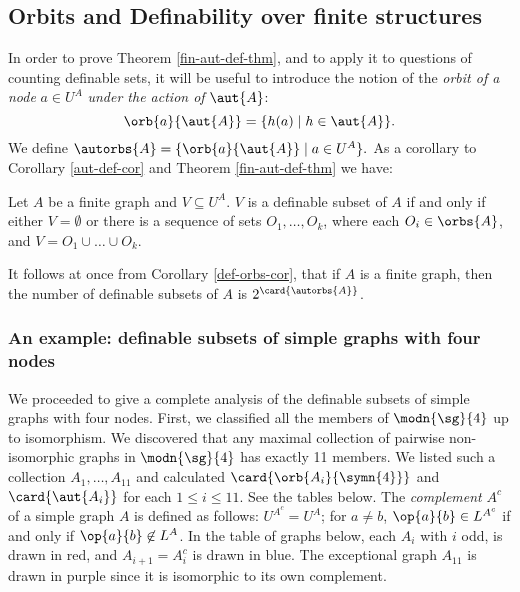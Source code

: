 \subsection{Orbits and Definability over finite structures}

In order to prove Theorem \ref{fin-aut-def-thm}, and to apply it to questions of counting definable sets, it will be useful to introduce the notion of the \emph{orbit of a node} $a\in U^A$ \emph{under the action of} $\aut{A}$:
\[
\orb{a}{\aut{A}}=\{h(a)\mid h\in\aut{A}\}.
\]
We define $\autorbs{A}=\{\orb{a}{\aut{A}}\mid a\in U^A\}.$ As a corollary to Corollary \ref{aut-def-cor} and Theorem \ref{fin-aut-def-thm} we have:
\begin{corollary}\label{def-orbs-cor}
Let $A$ be a finite graph and $V\subseteq U^A$. $V$ is a definable subset of $A$ if and only if either $V=\emptyset$ or there is a sequence of sets $O_1, \ldots,O_k$, where each $O_i\in\orbs{A}$, and $V = O_1\cup\ldots\cup O_k$.
\end{corollary}
It follows at once from Corollary \ref{def-orbs-cor}, that if $A$ is a finite graph, then the number of definable subsets of $A$ is $2^{\card{\autorbs{A}}}$. 
\iffalse
\subsubsection{An example: definable subsets of simple graphs with four nodes}

We proceeded to give a complete analysis of the definable subsets of simple graphs with four nodes. First, we classified all the members of $\modn{\sg}{4}$ up to isomorphism. We discovered that any maximal collection of pairwise non-isomorphic graphs in $\modn{\sg}{4}$ has exactly 11 members. We listed such a collection $A_1,\ldots,A_{11}$ and calculated $\card{\orb{A_i}{\symn{4}}}$ and $\card{\aut{A_i}}$ for each $1\leq i\leq 11$. See the tables below. The \emph{complement} $A^c$ of a simple graph $A$ is defined as follows: $U^{A^c}=U^A$; for $a\neq b$, $\op{a}{b}\in L^{A^c}$ if and only if $\op{a}{b}\not\in L^{A}$. In the table of graphs below, each $A_i$ with $i$ odd, is drawn in red, and $A_{i+1} = A_i^c$ is drawn in blue. The exceptional graph $A_{11}$ is drawn in purple since it is isomorphic to its own complement. 

